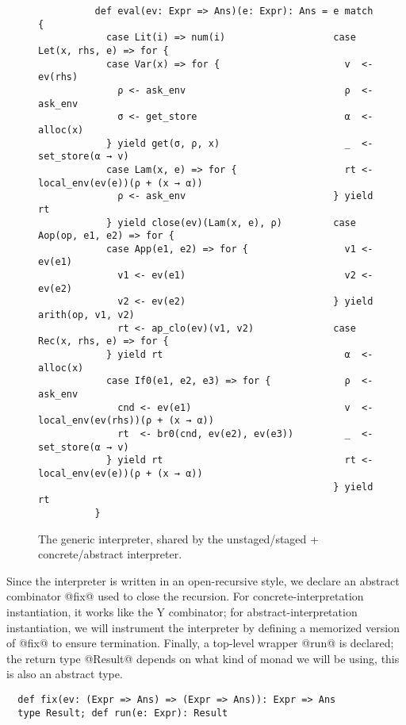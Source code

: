 \begin{figure}[h!]
  \centering
  \begin{lstlisting}
          def eval(ev: Expr => Ans)(e: Expr): Ans = e match {
            case Lit(i) => num(i)                   case Let(x, rhs, e) => for {
            case Var(x) => for {                      v  <- ev(rhs)
              ρ <- ask_env                            ρ  <- ask_env
              σ <- get_store                          α  <- alloc(x)
            } yield get(σ, ρ, x)                      _  <- set_store(α → v)
            case Lam(x, e) => for {                   rt <- local_env(ev(e))(ρ + (x → α))
              ρ <- ask_env                          } yield rt
            } yield close(ev)(Lam(x, e), ρ)         case Aop(op, e1, e2) => for {
            case App(e1, e2) => for {                 v1 <- ev(e1)                                               
              v1 <- ev(e1)                            v2 <- ev(e2)
              v2 <- ev(e2)                          } yield arith(op, v1, v2)
              rt <- ap_clo(ev)(v1, v2)              case Rec(x, rhs, e) => for {
            } yield rt                                α  <- alloc(x)
            case If0(e1, e2, e3) => for {             ρ  <- ask_env
              cnd <- ev(e1)                           v  <- local_env(ev(rhs))(ρ + (x → α))
              rt  <- br0(cnd, ev(e2), ev(e3))         _  <- set_store(α → v)
            } yield rt                                rt <- local_env(ev(e))(ρ + (x → α))
                                                    } yield rt                    
          }
  \end{lstlisting}
\caption{The generic interpreter,
  shared by the unstaged/staged + concrete/abstract interpreter.}
\label{fig:shared_int}
\end{figure}

Since the interpreter is written in an open-recursive style, we declare an abstract
combinator @fix@ used to close the recursion. For concrete-interpretation instantiation, it
works like the Y combinator; for abstract-interpretation instantiation, we will
instrument the interpreter by defining a memorized version of @fix@ to ensure
termination. Finally, a top-level wrapper @run@ is declared; the return type
@Result@ depends on what kind of monad we will be using, this is also an abstract type.

\begin{lstlisting}
  def fix(ev: (Expr => Ans) => (Expr => Ans)): Expr => Ans
  type Result; def run(e: Expr): Result
\end{lstlisting}

